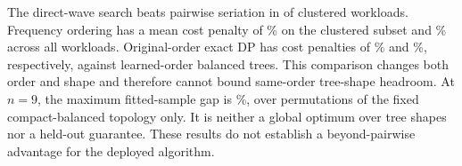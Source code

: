 The direct-wave search beats pairwise seriation in \VnineHigherOrderWins{} of
\VnineHigherOrderCases{} clustered workloads. Frequency ordering has a mean
cost penalty of \VnineFrequencyClusterPenalty\% on the clustered subset and
\VnineFrequencyAllPenalty\% across all workloads. Original-order exact DP has
cost penalties of \VnineExactClusterPenalty\% and \VnineExactAllPenalty\%,
respectively, against learned-order balanced trees. This comparison changes
both order and shape and therefore cannot bound same-order tree-shape headroom.
At $n=9$, the maximum fitted-sample gap is \VnineSmallGap\%, over permutations
of the fixed compact-balanced topology only. It is neither a global optimum
over tree shapes nor a held-out guarantee. These results do not establish a
beyond-pairwise advantage for the deployed algorithm.

